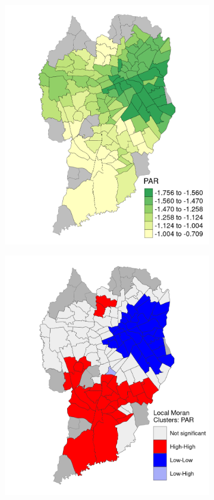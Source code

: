 \begin{figure}[!htbp]
    \centering\footnotesize
    \captionsetup{font=footnotesize}
    \caption{PAR COEFFICIENT ESTIMATES}
    \begin{subfigure}{0.5\textwidth}
        \includegraphics{fig/PAR.png}
    \end{subfigure}%
    \begin{subfigure}{0.5\textwidth}
        \includegraphics{fig/lisa_PAR.png}

\end{subfigure}
\end{figure}
